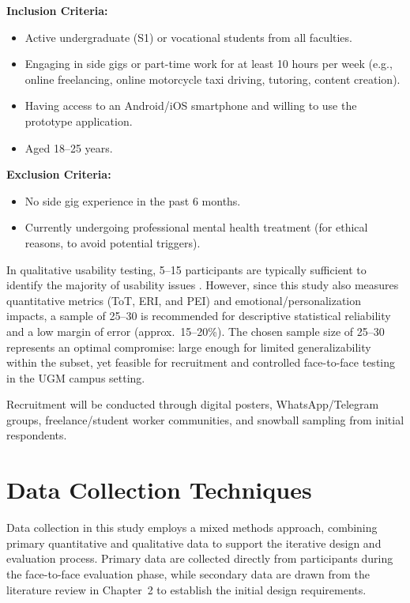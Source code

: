 \textbf{Inclusion Criteria:}
\begin{itemize}
    \item Active undergraduate (S1) or vocational students from all faculties.
    \item Engaging in side gigs or part-time work for at least 10 hours per week (e.g., online freelancing, online motorcycle taxi driving, tutoring, content creation).
    \item Having access to an Android/iOS smartphone and willing to use the prototype application.
    \item Aged 18--25 years.
\end{itemize}

\textbf{Exclusion Criteria:}
\begin{itemize}
    \item No side gig experience in the past 6 months.
    \item Currently undergoing professional mental health treatment (for ethical reasons, to avoid potential triggers).
\end{itemize}

In qualitative usability testing, 5--15 participants are typically sufficient to identify the majority of usability issues \cite{nielsen2000fiveusers}. However, since this study also measures quantitative metrics (ToT, ERI, and PEI) and emotional/personalization impacts, a sample of 25--30 is recommended for descriptive statistical reliability and a low margin of error (approx.\ 15--20\%). The chosen sample size of 25--30 represents an optimal compromise: large enough for limited generalizability within the subset, yet feasible for recruitment and controlled face-to-face testing in the UGM campus setting.

Recruitment will be conducted through digital posters, WhatsApp/Telegram groups, freelance/student worker communities, and snowball sampling from initial respondents.

\section{Data Collection Techniques}

Data collection in this study employs a mixed methods approach, combining primary quantitative and qualitative data to support the iterative design and evaluation process. Primary data are collected directly from participants during the face-to-face evaluation phase, while secondary data are drawn from the literature review in Chapter~2 to establish the initial design requirements.

